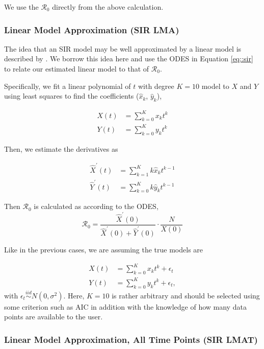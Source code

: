 \documentclass[12pt]{article}
\newcommand{\rr}{\ensuremath{\mathcal{R}_0}}
\begin{document}
We use the \(\rr\) directly from the above calculation.

\subsubsection{Linear Model Approximation (SIR LMA)}\label{linear-model-approximation-degree-10}

The idea that an SIR model may be well approximated by a linear model is described by \cite{chang2017}.  We borrow this idea here and use the ODES in Equation \eqref{eq::sir} to relate our estimated linear model to that of $\rr$.

Specifically, we fit a linear polynomial of \(t\) with degree \(K= 10\) model to \(X\)
and \(Y\) using least squares to find the coefficients (\(\hat{x}_k\),
\(\hat{y}_k\)),

\begin{align*}
X(t) &= \sum_{k=0}^K x_k t^k\\
{Y}(t) &= \sum_{k=0}^K y_k t^k
\end{align*}

Then, we estimate the derivatives as

\begin{align*}
\hat{X}^\prime(t) &= \sum_{k=1}^K k \hat{x}_k t^{k-1}\\
\hat{Y}^\prime(t) &= \sum_{k=0}^K k \hat{y}_k t^{k-1}
\end{align*}

Then \(\rr\) is calculated as according to the ODES,
\[\rr = \frac{\hat{X}^\prime(0)}{ \hat{X}^\prime(0) + \hat{Y}^\prime(0)} \cdot \frac{N}{X(0)} \]

Like in the previous cases, we are assuming the true models are

\begin{align*}
X(t) &= \sum_{k=0}^K x_k t^k + \epsilon_t\\
  {Y}(t) &= \sum_{k=0}^K y_k t^k + \epsilon_t,
\end{align*}
with $\epsilon_t \overset{iid}{\sim} N(0, \sigma^2)$.  Here, $K=10$ is rather arbitrary and should be selected using some criterion such as AIC in addition with the knowledge of how many data points are available to the user.

\subsubsection{Linear Model Approximation, All Time Points (SIR LMAT)}\label{linear-model-approximation-all-time-points-degree-10}
\end{document}
